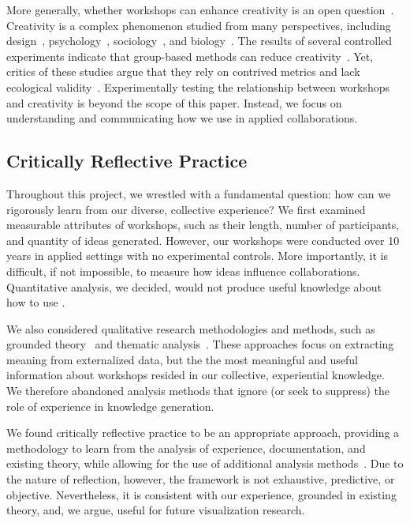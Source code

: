 More generally, whether workshops can enhance creativity is an open question~\cite{Nickerson1999,Sawyer2006}. 
Creativity is a complex phenomenon studied from many perspectives, including design~\cite{Shneiderman2005}, psychology~\cite{Sawyer2006}, sociology~\cite{Lubart1999}, and biology~\cite{Martindale1999}. The results of several controlled experiments indicate that group-based methods can reduce creativity~\cite{Bouchard1969,Mullen1991}. Yet, critics of these studies argue that they rely on contrived metrics and lack ecological validity~\cite{Hewett2005,Mayer1999}. Experimentally testing the relationship between workshops and creativity is beyond the scope of this paper. Instead, we focus on understanding and communicating how we use \workshops in applied collaborations.


\subsection{Critically Reflective Practice}

Throughout this project, we wrestled with a fundamental question: how can we rigorously learn from our diverse, collective experience? We first examined measurable attributes of workshops, such as their length, number of participants, and quantity of ideas generated. However, our workshops were conducted over 10 years in applied settings with no experimental controls. More importantly, it is difficult, if not impossible, to measure how ideas influence collaborations. Quantitative analysis, we decided, would not produce useful knowledge about how to use \workshops. 

We also considered qualitative research methodologies and methods, such as grounded theory~\cite{Corbin1990} and thematic analysis~\cite{Braun2006}. These approaches focus on extracting meaning from externalized data, but the the most meaningful and useful information about workshops resided in our collective, experiential knowledge. We therefore abandoned analysis methods that ignore (or seek to suppress) the role of experience in knowledge generation. 

We found critically reflective practice to be an appropriate approach, providing a methodology to learn from the analysis of experience, documentation, and existing theory, while allowing for the use of additional analysis methods~\cite{Brookfield1998,Thompson2008}. Due to the nature of reflection, however, the framework is not exhaustive, predictive, or objective. Nevertheless, it is consistent with our experience, grounded in existing theory, and, we argue, useful for future visualization research.

